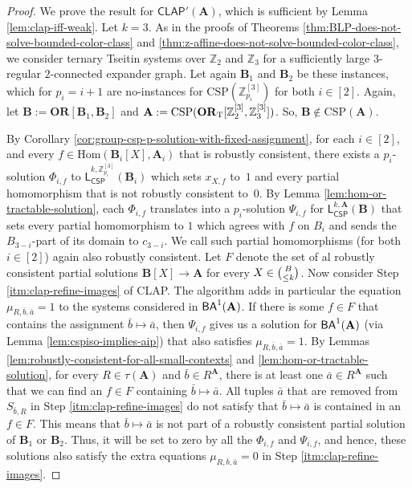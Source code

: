 \documentclass[a4paper,english, thm-restate]{lipics-v2021}
\newcommand{\ZZ}{\mathbb{Z}}
\newcommand{\tup}[1]{\bar{#1}}
\newcommand{\StructA}{\mathbf{A}}
\newcommand{\StructB}{\mathbf{B}}
\newcommand{\CSP}[1]{\mathrm{CSP}(#1)}
\newcommand{\Hom}[2]{\mathrm{Hom}(#1,#2)}
\newcommand{\leqs}{\mathsf{L}}
\newcommand{\cspiso}[3]{\leqs^{#1,#2}_{\mathsf{CSP}}(#3)}
\newcommand{\CosetGrpTmplt}[2]{#1^{[#2]}}
\newcommand{\OR}[1]{\mathbf{OR}[#1]}
\newcommand{\CLAPw}[1]{\mathsf{CLAP'}(#1)}
\begin{document}
	\clapDoesNotSolveAll*
	\begin{proof}
		We prove the result for $\CLAPw{\StructA}$, which is sufficient by Lemma \ref{lem:clap-iff-weak}.
		Let $k=3$.
		As in the proofs of Theorems \ref{thm:BLP-does-not-solve-bounded-color-class} and \ref{thm:z-affine-does-not-solve-bounded-color-class}, 
		we consider ternary Tseitin systems over $\ZZ_2$ and $\ZZ_3$
		for a sufficiently large $3$-regular $2$-connected expander graph.
		Let again $\StructB_1$ and $\StructB_2$ be these instances,
		which for $p_i= i+1$ are no-instances for $\CSP{\CosetGrpTmplt{\ZZ_{p_i}}{3}}$
		for both $i \in[2]$.
		Again, let $\StructB := \OR{\StructB_1,\StructB_2}$
		and $\StructA := \CSP{\ZtwoOrThreeInst}$.
		So, $\StructB \notin \CSP{\StructA}$.
		
		By Corollary \ref{cor:group-csp-p-solution-with-fixed-assignment}, for each $i \in [2]$, and every $f \in \Hom{\StructB_i[X]}{\StructA_i}$ that is robustly consistent, 
		there exists a $p_i$-solution $\Phi_{i,f}$ to $\cspiso{k}{\CosetGrpTmplt{\ZZ_{p_i}}{3}}{\StructB_i}$ which sets $x_{X,f}$ to~$1$ and every partial homomorphism that is not robustly consistent to~$0$.
		By Lemma \ref{lem:hom-or-tractable-solution}, each $\Phi_{i,f}$ translates into a $p_i$-solution $\Psi_{i,f}$ for $\cspiso{k}{\StructA}{\StructB}$ that sets every partial homomorphism to $1$ which agrees with $f$ on $B_i$ and sends the $B_{3-i}$-part of its domain to $c_{3-i}$.
		We call such partial homomorphisms (for both $i\in[2]$)
		again also robustly consistent.
		Let $F$ denote the set of al robustly consistent  partial solutions 
		$\StructB[X] \to \StructA$ for every $X \in \tbinom{B}{\leq k}$.
		Now consider Step \ref{itm:clap-refine-images} of CLAP. The algorithm adds in particular the equation $\mu_{R,\tup{b},\tup{a}} = 1$ to the systems considered in $\BAk{1}{\StructA}$.
		If there is some $f \in F$ that contains the assignment $\tup{b} \mapsto \tup{a}$, then $\Psi_{i,f}$ gives us a solution for $\BAk{1}{\StructA}$ (via Lemma \ref{lem:cspiso-implies-aip}) that also satisfies $\mu_{R,\tup{b},\tup{a}} = 1$.
		By Lemmas \ref{lem:robustly-consistent-for-all-small-contexts} and \ref{lem:hom-or-tractable-solution}, for every $R \in \tau(\StructA)$ and $\bar{b} \in R^{\StructA}$, there is at least one $\bar{a} \in R^{\StructA}$ such that we can find an $f \in F$ containing $\bar{b} \mapsto \bar{a}$. All tuples $\bar{a}$ that are removed from $S_{\bar{b},R}$ in Step \ref{itm:clap-refine-images} do not satisfy that $\bar{b} \mapsto \bar{a}$ is contained in an $f \in F$. This means that $\bar{b} \mapsto \bar{a}$ is not part of a robustly consistent partial solution of $\StructB_1$ or $\StructB_2$. Thus, it will be set to zero by all the $\Phi_{i,f}$ and $\Psi_{i,f}$, and hence, these solutions also satisfy the extra equations $\mu_{R,\tup{b},\tup{a}} = 0$ in Step \ref{itm:clap-refine-images}.

\end{proof}
\end{document}
